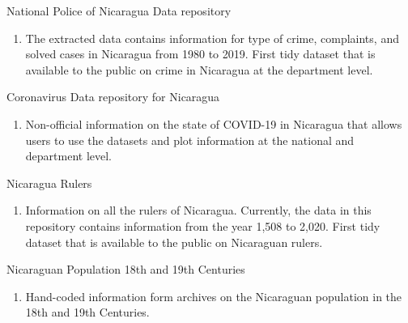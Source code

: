 \documentclass[a4paper,10pt]{article}
\renewenvironment{itemize}{
  \begin{list}{}
    { \setlength{\itemsep}{5pt}
      \setlength{\parsep}{0pt}
      \setlength{\topsep}{0pt}
      \setlength{\leftmargin}{0em} } }{
  \end{list}}
\begin{document}
\begin{itemize}
   National Police of Nicaragua Data repository \href{https://github.com/RRMaximiliano/policia-nacional-nic-stats}{\faGithub}
   \begin{enumerate}[label = {-}]
    \item The extracted data contains information for type of crime, complaints, and solved cases in Nicaragua from 1980 to 2019. First tidy dataset that is available to the public on crime in Nicaragua at the department level. 
   \end{enumerate}
   Coronavirus Data repository for Nicaragua \href{https://github.com/RRMaximiliano/observatorio-covid-nicaragua}{\faGithub}
   \begin{enumerate}[label = {-}]
    \item Non-official information on the state of COVID-19 in Nicaragua that allows users to use the datasets and plot information at the national and department level. 
   \end{enumerate}
   Nicaragua Rulers \href{https://github.com/RRMaximiliano/observatorio-covid-nicaragua}{\faGithub}
   \begin{enumerate}[label = {-}]
    \item Information on all the rulers of Nicaragua. Currently, the data in this repository contains information from the year 1,508 to 2,020. First tidy dataset that is available to the public on Nicaraguan rulers.
   \end{enumerate}
   Nicaraguan Population 18th and 19th Centuries \href{https://github.com/RRMaximiliano/poblacion-nicaragua-siglo-18-19}{\faGithub}
   \begin{enumerate}[label = {-}]
    \item Hand-coded information form archives on the Nicaraguan population in the 18th and 19th Centuries.
   \end{enumerate}
\end{itemize}

\end{document}
